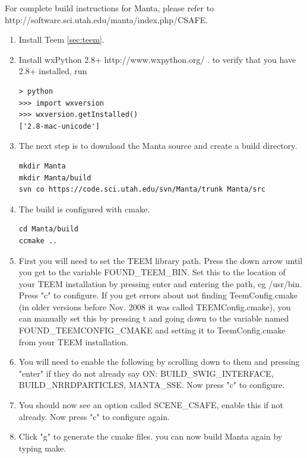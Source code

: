 \documentclass[12pt]{article}
\begin{document}
For complete build instructions for Manta, please refer to
http://software.sci.utah.edu/manta/index.php/CSAFE.  

\begin{enumerate}
\item
Install Teem \ref{sec:teem}.
\item
Install wxPython 2.8+ http://www.wxpython.org/ .  
to verify that you have 2.8+ installed, run
\begin{Verbatim}
> python
>>> import wxversion
>>> wxversion.getInstalled()
['2.8-mac-unicode']
\end{Verbatim}
\item
The next step is to download the Manta source and create a build directory.
\begin{Verbatim}
mkdir Manta
mkdir Manta/build
svn co https://code.sci.utah.edu/svn/Manta/trunk Manta/src
\end{Verbatim}
\item
The build is configured with cmake.
\begin{Verbatim}
cd Manta/build
ccmake ..
\end{Verbatim}
\item
 First you will need to set the TEEM library path. Press the down arrow until you get to the variable FOUND\_TEEM\_BIN. Set this to the location of your TEEM installation by pressing enter and entering the path, eg /usr/bin. Press "c" to configure. If you get errors about not finding TeemConfig.cmake (in older versions before Nov. 2008 it was called TEEMConfig.cmake), you can manually set this by pressing t and going down to the variable named FOUND\_TEEMCONFIG\_CMAKE and setting it to TeemConfig.cmake from your TEEM installation. 
 \item
 You will need to enable the following by scrolling down to them and pressing "enter" if they do not already say ON: BUILD\_SWIG\_INTERFACE, BUILD\_NRRDPARTICLES, MANTA\_SSE. Now press "c" to configure. 
 \item
 You should now see an option called SCENE\_CSAFE, enable this if not already. Now press "c" to configure again. 
 \item
 Click "g" to generate the cmake files. you can now build Manta again by typing make. 
\end{enumerate}
\end{document}
